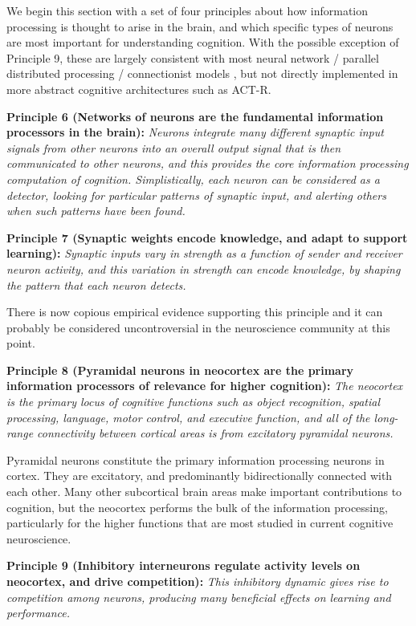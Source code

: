 \documentclass[11pt,twoside]{article}
\begin{document}
We begin this section with a set of four principles about how information
processing is thought to arise in the brain, and which specific types of
neurons are most important for understanding cognition. With the possible
exception of Principle 9, these are largely consistent with most neural
network / parallel distributed processing / connectionist models
\cite{McClelland93,McClellandRumelhart86,McClellandRumelhart88,RumelhartMcClelland86,OReilly98}, but not directly implemented in more abstract cognitive architectures such as ACT-R.

{\bf Principle 6 (Networks of neurons are the fundamental information
  processors in the brain):} {\em Neurons integrate many different synaptic
  input signals from other neurons into an overall output signal that is then
  communicated to other neurons, and this provides the core information
  processing computation of cognition.  Simplistically, each neuron can be
  considered as a detector, looking for particular patterns of synaptic input,
  and alerting others when such patterns have been found.}

{\bf Principle 7 (Synaptic weights encode knowledge, and adapt to support
  learning):} {\em Synaptic inputs vary in strength as a function of sender
  and receiver neuron activity, and this variation in strength can encode
  knowledge, by shaping the pattern that each neuron detects.}

There is now copious empirical evidence supporting this principle and it can
probably be considered uncontroversial in the neuroscience community at this
point.

{\bf Principle 8 (Pyramidal neurons in neocortex are the primary information
  processors of relevance for higher cognition):} {\em The neocortex is the
  primary locus of cognitive functions such as object recognition, spatial
  processing, language, motor control, and executive function, and all of the
  long-range connectivity between cortical areas is from excitatory pyramidal
  neurons.} 

Pyramidal neurons constitute the primary information processing neurons in
cortex.  They are excitatory, and predominantly bidirectionally
connected with each other.  Many other subcortical brain areas make important
contributions to cognition, but the neocortex performs the bulk of the
information processing, particularly for the higher functions that are most
studied in current cognitive neuroscience.

{\bf Principle 9 (Inhibitory interneurons regulate activity levels on
  neocortex, and drive competition):} {\em This
  inhibitory dynamic gives rise to competition among neurons, producing many
  beneficial effects on learning and performance.}
\end{document}
